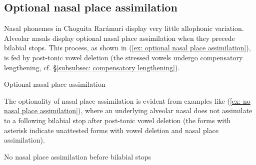 \subsection{Optional nasal place assimilation}
\label{subsec: optional nasal place assimilation}

Nasal phonemes in Choguita Rarámuri display very little allophonic variation. Alveolar nasals display optional nasal place assimilation when they precede bilabial stops. This process, as shown in (\ref{ex: optional nasal place assimilation}), is fed by post-tonic vowel deletion (the stressed vowels undergo compensatory lengthening, cf. §\ref{subsubsec: compensatory lengthening}).

\ea\label{ex: optional nasal place assimilation}
{Optional nasal place assimilation}

    \z
\z

The optionality of nasal place assimilation is evident from examples like (\ref{ex: no nasal place assimilation}), where an underlying alveolar nasal does not assimilate to a following bilabial stop after post-tonic vowel deletion (the forms with asterisk indicate unattested forms with vowel deletion and nasal place assimilation).

\ea\label{ex: no nasal place assimilation}
{No nasal place assimilation before bilabial stops}

